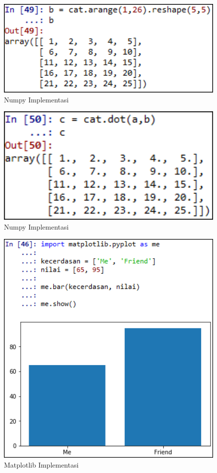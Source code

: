 \begin{figure}[ht]
	\centerline{\includegraphics[width=1\textwidth]{figures/fathi/chapter3/hari2/22.png}}
	\caption{Numpy Implementasi}
	\label{numpy2}
\end{figure}

\begin{figure}[ht]
	\centerline{\includegraphics[width=1\textwidth]{figures/fathi/chapter3/hari2/23.png}}
	\caption{Numpy Implementasi}
	\label{numpy3}
\end{figure}

\begin{figure}[ht]
	\centerline{\includegraphics[width=1\textwidth]{figures/fathi/chapter3/hari2/3.png}}
	\caption{Matplotlib Implementasi}
	\label{matplotlib}
\end{figure}

